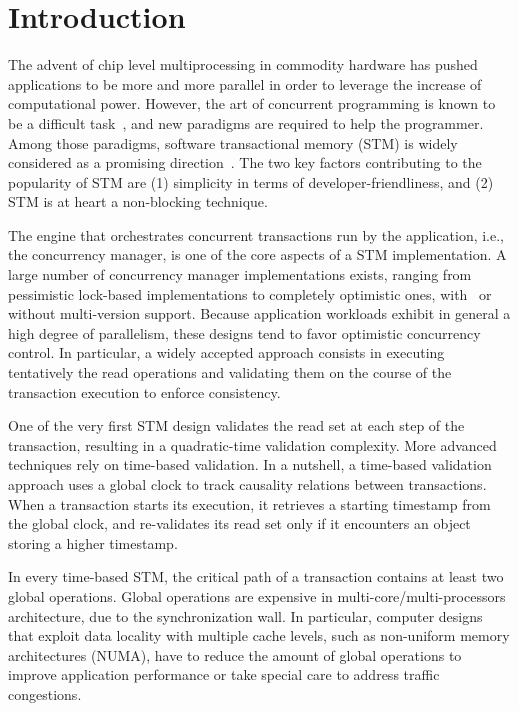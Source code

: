 \section{Introduction}

The advent of chip level multiprocessing in commodity hardware has pushed applications 
to be more and more parallel in order to leverage the increase of computational power.
However, the art of concurrent programming is known to be a difficult task~\cite{Lee:2006:PT:1137232.1137289}, 
and new paradigms are required to help the programmer.
Among those paradigms, software transactional memory (STM) is widely considered as a promising direction~\cite{Dragojevic:2011:WSM:1924421.1924440}.
The two key factors contributing to the popularity of STM are (1) simplicity in terms of developer-friendliness,
and (2) STM is at heart a non-blocking technique.

The engine that orchestrates concurrent transactions run by the application, i.e., the concurrency manager, is one of the core aspects of a STM implementation. %
A large number of concurrency manager implementations exists, ranging from pessimistic lock-based implementations to completely optimistic ones, with~\cite{perelman2011smv} or without multi-version support.
Because application workloads exhibit in general a high degree of parallelism, these designs tend to favor optimistic concurrency control.
In particular, a widely accepted approach consists in executing tentatively the read operations and validating them on the course of the transaction execution to enforce consistency.

One of the very first STM design validates the read set at each step of the transaction, resulting in a quadratic-time validation complexity. 
More advanced techniques rely on time-based validation.
In a nutshell, a time-based validation approach uses a global clock to track causality relations between transactions.
When a transaction starts its execution, it retrieves a starting timestamp from the global clock, and re-validates its read set only if it encounters an object storing a higher timestamp.

In every time-based STM, the critical path of a transaction contains at least two global operations.
Global operations are expensive in multi-core/multi-processors architecture, due to the synchronization wall.
In particular, computer designs that exploit data locality with multiple cache levels, such as non-uniform memory architectures (NUMA), have to reduce the amount of global operations to improve application performance or take special care to address traffic congestions\cite{dashti2013traffic}.

